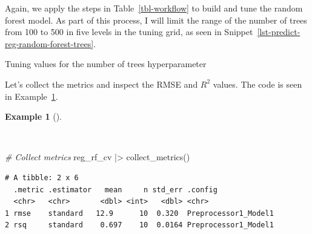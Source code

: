 \documentclass[
  letterpaper,
]{latex/krantz}
\newenvironment{Shaded}{\begin{snugshade}}{\end{snugshade}}
\newcommand{\AttributeTok}[1]{\textcolor[rgb]{0.00,0.00,0.00}{#1}}
\newcommand{\CommentTok}[1]{\textcolor[rgb]{0.00,0.00,0.00}{\textit{#1}}}
\newcommand{\DecValTok}[1]{\textcolor[rgb]{0.00,0.00,0.00}{#1}}
\newcommand{\FunctionTok}[1]{\textcolor[rgb]{0.00,0.00,0.00}{#1}}
\newcommand{\NormalTok}[1]{\textcolor[rgb]{0.00,0.00,0.00}{#1}}
\newcommand{\OtherTok}[1]{\textcolor[rgb]{0.00,0.00,0.00}{#1}}
\newcommand{\SpecialCharTok}[1]{\textcolor[rgb]{0.00,0.00,0.00}{#1}}
\theoremstyle{definition}
\newtheorem{example}{Example}[chapter]
\theoremstyle{remark}
\begin{document}
Again, we apply the steps in Table~\ref{tbl-workflow} to build and tune
the random forest model. As part of this process, I will limit the range
of the number of trees from 100 to 500 in five levels in the tuning
grid, as seen in Snippet~\ref{lst-predict-reg-random-forest-trees}.

\begin{codelisting}

\caption{\label{lst-predict-reg-random-forest-trees}Tuning values for
the number of trees hyperparameter}

\centering{

\begin{Shaded}
\begin{Highlighting}[]
\NormalTok{reg\_grid }\OtherTok{\textless{}{-}}
  \FunctionTok{grid\_regular}\NormalTok{(}\FunctionTok{trees}\NormalTok{(}\AttributeTok{range =} \FunctionTok{c}\NormalTok{(}\DecValTok{100}\NormalTok{, }\DecValTok{500}\NormalTok{)), }\AttributeTok{levels =} \DecValTok{5}\NormalTok{)}
\end{Highlighting}
\end{Shaded}

}

\end{codelisting}%

Let's collect the metrics and inspect the RMSE and \(R^2\) values. The
code is seen in Example~\ref{exm-predict-reg-metrics-rf}.

\begin{example}[]\protect\hypertarget{exm-predict-reg-metrics-rf}{}\label{exm-predict-reg-metrics-rf}

~

\begin{Shaded}
\begin{Highlighting}[]
\CommentTok{\# Collect metrics}
\NormalTok{reg\_rf\_cv }\SpecialCharTok{|\textgreater{}} \FunctionTok{collect\_metrics}\NormalTok{()}
\end{Highlighting}
\end{Shaded}

\begin{verbatim}
# A tibble: 2 x 6
  .metric .estimator   mean     n std_err .config             
  <chr>   <chr>       <dbl> <int>   <dbl> <chr>               
1 rmse    standard   12.9      10  0.320  Preprocessor1_Model1
2 rsq     standard    0.697    10  0.0164 Preprocessor1_Model1
\end{verbatim}

\end{example}
\end{document}
